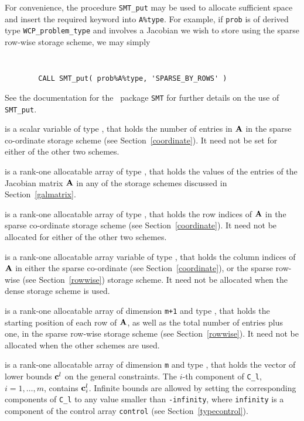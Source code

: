 \documentclass{galahad}
\newcommand{\packagename}{WCP}
\begin{document}
\begin{description}
\begin{description}
For convenience, the procedure {\tt SMT\_put} 
may be used to allocate sufficient space and insert the required keyword
into {\tt A\%type}.
For example, if {\tt prob} is of derived type {\tt \packagename\_problem\_type}
and involves a Jacobian we wish to store using the sparse row-wise 
storage scheme, we may simply
{\tt 
\begin{verbatim}
        CALL SMT_put( prob%A%type, 'SPARSE_BY_ROWS' )
\end{verbatim}
}
\noindent
See the documentation for the \galahad\ package {\tt SMT} 
for further details on the use of {\tt SMT\_put}.

 is a scalar variable of type \integer, that 
holds the number of entries in ${\mathbf{A}}$
in the sparse co-ordinate storage scheme (see Section~\ref{coordinate}). 
It need not be set for either of the other two schemes.

 is a rank-one allocatable array of type \realdp, that holds
the values of the entries of the Jacobian matrix ${\mathbf{A}}$ in any of the 
storage schemes discussed in Section~\ref{galmatrix}.

 is a rank-one allocatable array of type \integer,
that holds the row indices of ${\mathbf{A}}$ in the sparse co-ordinate storage
scheme (see Section~\ref{coordinate}). 
It need not be allocated for either of the other two schemes.

 is a rank-one allocatable array variable of type \integer,
that holds the column indices of ${\mathbf{A}}$ in either the sparse co-ordinate 
(see Section~\ref{coordinate}), or the sparse row-wise 
(see Section~\ref{rowwise}) storage scheme.
It need not be allocated when the dense storage scheme is used.

 is a rank-one allocatable array of dimension {\tt m+1} and type 
\integer, that holds the 
starting position of each row of ${\mathbf{A}}$, as well
as the total number of entries plus one, in the sparse row-wise storage
scheme (see Section~\ref{rowwise}). It need not be allocated when the
other schemes are used.

\end{description}

 is a rank-one allocatable array of dimension {\tt m} and type 
\realdp, that holds the vector of lower bounds ${\mathbf{c}}^{l}$ 
on the general constraints. The $i$-th component of 
{\tt C\_l}, $i = 1, \ldots , m$, contains ${\mathbf{c}}_{i}^{l}$.
Infinite bounds are allowed by setting the corresponding 
components of {\tt C\_l} to any value smaller than {\tt -infinity}, 
where {\tt infinity} is a component of the control array {\tt control} 
(see Section~\ref{typecontrol}).


\end{description}
\end{document}
